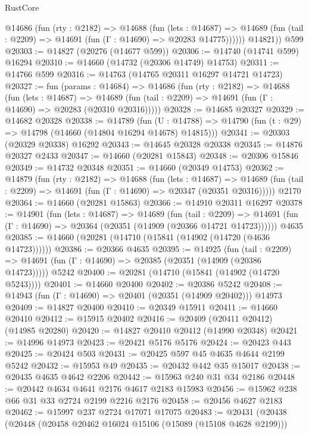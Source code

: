 \begin{lexlean}{RustCore}
\begin{coremodule}
          @14686
            (fun (rty : @2182) =>
            @14688
              (fun (lets : @14687) =>
              @14689 (fun (tail : @2209) => @14691 (fun (Γ : @14690) => @20283 @14775))))))
        @14821))
    @599
@20303 := @14827 (@20276 (@14677 @599))
@20306 := @14740 (@14741 @599) @16294
@20310 := @14660 (@14732 (@20306 @14749) @14753)
@20311 := @14766 @599
@20316 := @14763 (@14765 @20311 @16297 @14721 @14723)
@20327 := fun (params : @14684) =>
  @14686
    (fun (rty : @2182) =>
    @14688
      (fun (lets : @14687) =>
      @14689 (fun (tail : @2209) => @14691 (fun (Γ : @14690) => @20283 (@20310 @20316)))))
@20328 := @14685 @20327
@20329 := @14682 @20328
@20338 := @14789
    (fun (U : @14788) => @14790 (fun (t : @29) => @14798 (@14660 (@14804 @16294 @14678) @14815)))
@20341 := @20303 (@20329 @20338) @16292
@20343 := @14645 @20328 @20338
@20345 := @14876 @20327 @2433
@20347 := @14660 (@20281 @15843)
@20348 := @20306 @15846
@20349 := @14732 @20348
@20351 := @14660 (@20349 @14753)
@20362 := @14879
    (fun (rty : @2182) =>
    @14688
      (fun (lets : @14687) =>
      @14689 (fun (tail : @2209) => @14691 (fun (Γ : @14690) => @20347 (@20351 @20316)))))
    @2170
@20364 := @14660 (@20281 @15863)
@20366 := @14910 @20311 @16297
@20378 := @14901
    (fun (lets : @14687) =>
    @14689
      (fun (tail : @2209) =>
      @14691 (fun (Γ : @14690) => @20364 (@20351 (@14909 (@20366 @14721 @14723))))))
    @4635
@20385 := @14660 (@20281 (@14710 (@15841 (@14902 (@14720 (@4636 @14723))))))
@20386 := @20366 @4635
@20395 := @14925
    (fun (tail : @2209) => @14691 (fun (Γ : @14690) => @20385 (@20351 (@14909 (@20386 @14723)))))
    @5242
@20400 := @20281 (@14710 (@15841 (@14902 (@14720 @5243))))
@20401 := @14660 @20400
@20402 := @20386 @5242
@20408 := @14943 (fun (Γ : @14690) => @20401 (@20351 (@14909 @20402))) @14973
@20409 := @14827 @20400
@20410 := @20349 @15911
@20411 := @14660 @20410
@20412 := @15915 @20402
@20416 := @20409 (@20411 @20412) (@14985 @20280)
@20420 := @14827 @20410 @20412 (@14990 @20348)
@20421 := @14996 @14973
@20423 := @20421 @5176 @5176
@20424 := @20423 @443
@20425 := @20424 @503
@20431 := @20425 @597 @45 @4635 @4644 @2199 @5242
@20432 := @15953 @49
@20435 := @20432 @442 @35 @15017
@20438 := @20435 @4635 @4642 @2206
@20442 := @15963 @240 @31 @34 @2186
@20448 := @20442 @4634 @4641 @2176 @4617 @2183 @15983
@20456 := @15962 @238 @66 @31 @33 @2724 @2199 @2216 @2176
@20458 := @20456 @4627 @2183
@20462 := @15997 @237 @2724 @17071 @17075
@20483 := @20431
    (@20438
      (@20448
        (@20458 @20462 @16024 @15106 (@15089 (@15108 @4628 @2199)))

\end{coremodule}
\end{lexlean}
